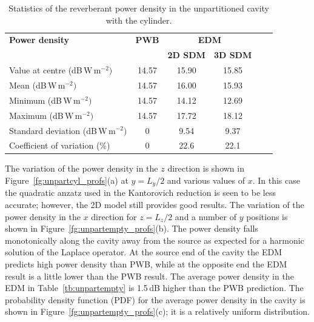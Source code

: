 \documentclass[a4paper]{article}
\numberwithin{equation}{section}
\newcounter{Table}
\newcounter{Figure}
\begin{document}
\begin{table}[ht]
\begin{center}
\begin{tabular}{|l|c|c|c|c|c|}
\hline
\textbf{Power density}               &\textbf{PWB} &\multicolumn{2}{|c|}{\textbf{EDM}} \\ \cline{3-4}
{}                                   &{}           &\textbf{2D SDM} &\textbf{3D SDM}  \\
\hline
Value at centre (dB\,W\,m$^{-2})$    &14.57        &15.90           &15.85 \\
Mean (dB\,W\,m$^{-2})$               &14.57        &16.00           &15.93 \\
Minimum (dB\,W\,m$^{-2})$            &14.57        &14.12           &12.69 \\
Maximum (dB\,W\,m$^{-2})$            &14.57        &17.72           &18.12 \\
Standard deviation (dB\,W\,m$^{-2})$ &0            &9.54            &9.37  \\
Coefficient of variation (\%)        &0            &22.6            &22.1  \\
\hline
\end{tabular}
\end{center}
\caption{\label{tb:unpartcyl} Statistics of the reverberant power density in the unpartitioned cavity with the cylinder.}
\end{table}

The variation of the power density in the $z$ direction is shown in Figure~\ref{fg:unpartcyl_profs}(a)
at $y=L_y/2$ and various values of $x$. In this case the quadratic anzatz used in the Kantorovich reduction
is seen to be less accurate; however, the 2D model still provides good results. The variation of the power density 
in the $x$ direction for $z=L_z/2$ and a number of $y$ positions is shown in Figure~\ref{fg:unpartempty_profs}(b).
The power density falls monotonically along the cavity away from the source as expected for a harmonic solution
of the Laplace operator. At the source end of the cavity the EDM predicts high power density than PWB, while 
at the opposite end the EDM result is a little lower than the PWB result. The average power density in the EDM in 
Table~\ref{tb:unpartempty} is 1.5\,dB higher than the PWB prediction. The probability density function (PDF)
for the average power density in the cavity is shown in Figure~\ref{fg:unpartempty_profs}(c); it is a relatively
uniform distribution.
\end{document}
